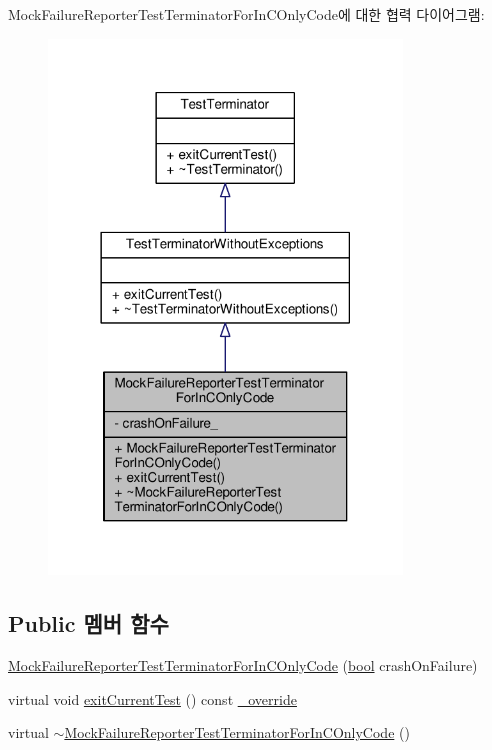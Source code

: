 Mock\+Failure\+Reporter\+Test\+Terminator\+For\+In\+C\+Only\+Code에 대한 협력 다이어그램\+:
\nopagebreak
\begin{figure}[H]
\begin{center}
\leavevmode
\includegraphics[width=266pt]{class_mock_failure_reporter_test_terminator_for_in_c_only_code__coll__graph}
\end{center}
\end{figure}
\subsection*{Public 멤버 함수}
\begin{DoxyCompactItemize}
\item 
\hyperlink{class_mock_failure_reporter_test_terminator_for_in_c_only_code_aab5c4bcd7c967f1cdfb2d3dbebf8d96c}{Mock\+Failure\+Reporter\+Test\+Terminator\+For\+In\+C\+Only\+Code} (\hyperlink{avb__gptp_8h_af6a258d8f3ee5206d682d799316314b1}{bool} crash\+On\+Failure)
\item 
virtual void \hyperlink{class_mock_failure_reporter_test_terminator_for_in_c_only_code_a3fca445c375314fd6d1d123473e00a38}{exit\+Current\+Test} () const \hyperlink{_cpp_u_test_config_8h_a049bea15dd750e15869863c94c1efc3b}{\+\_\+override}
\item 
virtual \hyperlink{class_mock_failure_reporter_test_terminator_for_in_c_only_code_a4d45baa5be243856ba291c951a37ce3b}{$\sim$\+Mock\+Failure\+Reporter\+Test\+Terminator\+For\+In\+C\+Only\+Code} ()
\end{DoxyCompactItemize}
